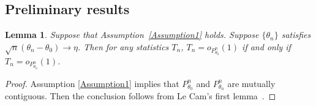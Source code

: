 \documentclass[11pt]{article}
\theoremstyle{plain}
\newtheorem{lemma}{\quad\quad Lemma}
\theoremstyle{definition}
\theoremstyle{remark}
\begin{document}
\begin{appendices}



\section{Preliminary results}
\begin{lemma}
        Suppose that Assumption~\ref{Assumption1} holds.
        Suppose $\{\theta_n\}$ satisfies $\sqrt{n}(\theta_n-\theta_0)\to \eta$.
        Then for any statistics $T_n$, $T_n = o_{P_{\theta_0}^n}(1)$ if and only if $T_n = o_{P_{\theta_n}^n}(1)$.
    \label{lemma:contiguous}
\end{lemma}
\begin{proof}
    Assumption \ref{Assumption1} implies that $P_{\theta_0}^n$ and $P_{\theta_n}^n$ are mutually contiguous. 
    Then the conclusion follows from Le Cam's first lemma~\citep[Lemma 6.4]{van2000asymptotic}.
\end{proof}


\end{appendices}
\end{document}
